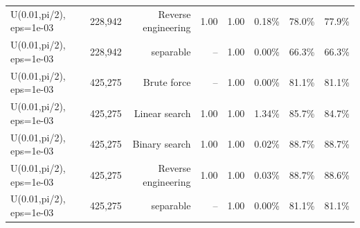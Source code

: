 \begin{tabular}{llrrrrrr}
U(0.01,pi/2), eps=1e-03 & 228,942 & Reverse engineering & 1.00 & 1.00 & 0.18\% & 78.0\% & 77.9\% \\
U(0.01,pi/2), eps=1e-03 & 228,942 & separable & -- & 1.00 & 0.00\% & 66.3\% & 66.3\% \\
U(0.01,pi/2), eps=1e-03 & 425,275 & Brute force & -- & 1.00 & 0.00\% & 81.1\% & 81.1\% \\
U(0.01,pi/2), eps=1e-03 & 425,275 & Linear search & 1.00 & 1.00 & 1.34\% & 85.7\% & 84.7\% \\
U(0.01,pi/2), eps=1e-03 & 425,275 & Binary search & 1.00 & 1.00 & 0.02\% & 88.7\% & 88.7\% \\
U(0.01,pi/2), eps=1e-03 & 425,275 & Reverse engineering & 1.00 & 1.00 & 0.03\% & 88.7\% & 88.6\% \\
U(0.01,pi/2), eps=1e-03 & 425,275 & separable & -- & 1.00 & 0.00\% & 81.1\% & 81.1\% \\
\bottomrule
\end{tabular}
